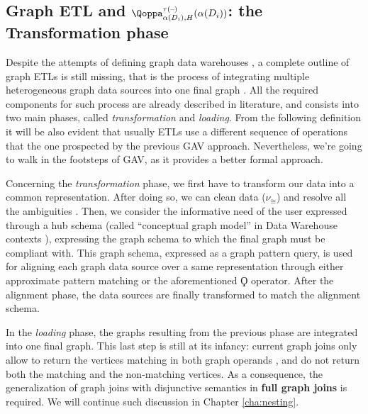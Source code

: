 \subsection{Graph ETL and $\qtransl^{\tau(\textup{--})}_{\abstr(D_i),H}(\abstr(D_i))$: the Transformation phase}\label{sec:ngusecases}

Despite the attempts of defining graph data warehouses \cite{Etcheverry2012a,EtcheverryV12b,
	Zhao11}, a complete outline of graph ETLs is still missing, that is the process of 
integrating multiple heterogeneous graph data sources into one final graph \cite{ChenYZHY08}. 
All the required components for such process are already described in literature, and consists
into two main phases, called \textit{transformation} and \textit{loading}. From the following definition it will be also evident that usually ETLs use a different sequence of operations that the one prospected by the previous GAV approach. Nevertheless, we're going to walk in the footsteps of GAV, as it provides a better formal approach.

Concerning the \textit{transformation} phase, we first have to transform our data into a common representation. After doing so, we can clean data ($\nu_\cong$) and resolve
all the ambiguities \cite{rahm2016case}. Then, we consider the informative need
of the user expressed through a hub schema (called ``conceptual graph model'' in Data Warehouse contexts \cite{jakawat}), expressing the
graph schema to which the final graph must be compliant with. This graph schema, expressed
as a graph pattern query, is used for aligning each graph data source \cite{Aligon201520}
over a same representation through either approximate pattern matching \cite{DeVirgilio2015} or the aforementioned $\Qoppa$ operator. After the alignment phase, the data sources are finally transformed to match the alignment schema. 

In the \textit{loading} phase, the graphs resulting from the previous phase
are integrated into one final graph. This last step is still at its infancy:
current graph joins only allow to return the vertices matching in both graph operands
\cite{BergamiMM17}, and do not return both the matching and the non-matching vertices.
As a consequence, the generalization of graph joins with
disjunctive semantics in \textbf{full graph joins} is required. We will continue such discussion in Chapter \vref{cha:nesting}.

